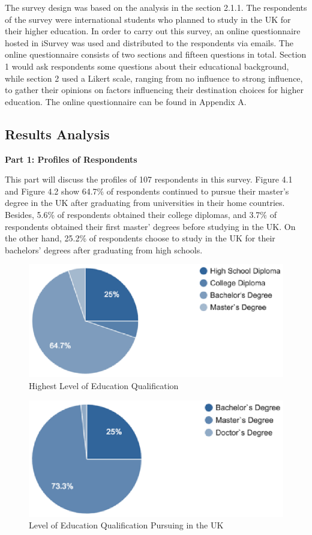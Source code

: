 The survey design was based on the analysis in the section 2.1.1. The respondents of the survey were international students who planned to study in the UK for their higher education. In order to carry out this survey, an online questionnaire hosted in iSurvey was used and distributed to the respondents via emails. The online questionnaire consists of two sections and fifteen questions in total. Section 1 would ask respondents some questions about their educational background, while section 2 used a Likert scale, ranging from no influence to strong influence, to gather their opinions on factors influencing their destination choices for higher education. The online questionnaire can be found in Appendix A.


\subsection{Results Analysis
}

\textbf{Part 1: Profiles of Respondents}

This part will discuss the profiles of 107 respondents in this survey. Figure 4.1 and Figure 4.2 show 64.7\% of respondents continued to pursue their master’s degree in the UK after graduating from universities in their home countries. Besides, 5.6\% of respondents obtained their college diplomas, and 3.7\% of respondents obtained their first master’ degrees before studying in the UK. On the other hand, 25.2\% of respondents choose to study in the UK for their bachelors’ degrees after graduating from high schools.

\begin{figure}[H]
  \centering
  \includegraphics[width=12cm]{./img/Picture4}
  \caption{Highest Level of Education Qualification}
  \label{Figure:figex}
\end{figure}

\begin{figure}[H]
  \centering
  \includegraphics[width=12cm]{./img/Picture5}
  \caption{Level of Education Qualification Pursuing in the UK}
  \label{Figure:figex}
\end{figure}

